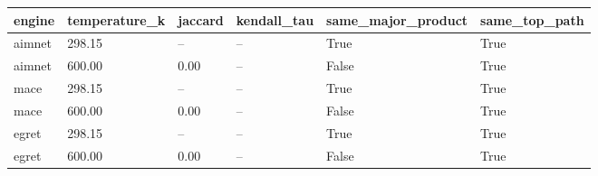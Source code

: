 \begin{tabular}{llllll}
\hline
engine & temperature\_k & jaccard & kendall\_tau & same\_major\_product & same\_top\_path \\
\hline
aimnet & 298.15 & -- & -- & True & True \\
aimnet & 600.00 & 0.00 & -- & False & True \\
mace & 298.15 & -- & -- & True & True \\
mace & 600.00 & 0.00 & -- & False & True \\
egret & 298.15 & -- & -- & True & True \\
egret & 600.00 & 0.00 & -- & False & True \\
\hline
\end{tabular}
